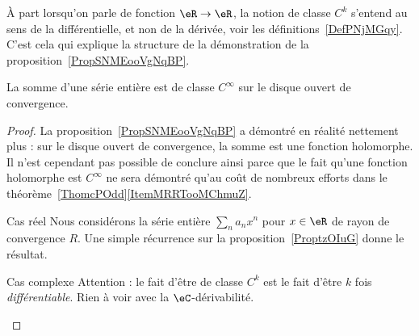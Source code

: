 \begin{remark}
    À part lorsqu'on parle de fonction \( \eR\to \eR\), la notion de classe \( C^k\) s'entend au sens de la différentielle, et non de la dérivée, voir les définitions~\ref{DefPNjMGqy}. C'est cela qui explique la structure de la démonstration de la proposition~\ref{PropSNMEooVgNqBP}.
\end{remark}

\begin{corollary}       \label{CorCBYHooQhgara}
    La somme d'une série entière est de classe \( C^{\infty}\) sur le disque ouvert de convergence.
\end{corollary}

\begin{proof}
    La proposition~\ref{PropSNMEooVgNqBP} a démontré en réalité nettement plus : sur le disque ouvert de convergence, la somme est une fonction holomorphe. Il n'est cependant pas possible de conclure ainsi parce que le fait qu'une fonction holomorphe est \( C^{\infty}\) ne sera démontré qu'au coût de nombreux efforts dans le théorème~\ref{ThomcPOdd}\ref{ItemMRRTooMChmuZ}.

    \begin{subproof}
    \item[Cas réel]
        Nous considérons la série entière \( \sum_na_nx^n\) pour \( x\in \eR\) de rayon de convergence \( R\). Une simple récurrence sur la proposition~\ref{ProptzOIuG} donne le résultat.
    \item[Cas complexe]
        Attention : le fait d'être de classe \( C^k\) est le fait d'être \( k\) fois \emph{différentiable}. Rien à voir avec la \( \eC\)-dérivabilité.


\end{subproof}
\end{proof}
